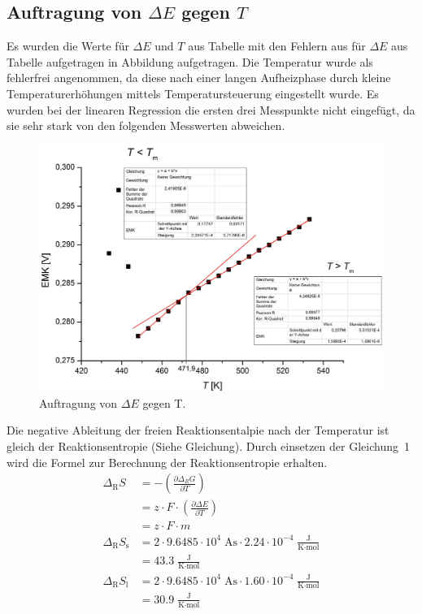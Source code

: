 \documentclass[12pt,a4paper,titlepage,headinclude,bibtotoc]{scrartcl}
\begin{document}
\subsection{Auftragung von $\Delta E$ gegen $T$}
Es wurden die Werte für $\Delta E$ und $T$ aus Tabelle mit den Fehlern aus für $\Delta E$ aus Tabelle aufgetragen in Abbildung aufgetragen. Die Temperatur wurde als fehlerfrei angenommen, da diese nach einer langen Aufheizphase durch kleine Temperaturerhöhungen mittels Temperatursteuerung eingestellt wurde. Es wurden bei der linearen Regression die ersten drei Messpunkte nicht eingefügt, da sie sehr stark von den folgenden Messwerten abweichen. 
\begin{figure}[h]
\includegraphics[width=13.5cm]{EGT.jpeg}
\caption{Auftragung von $\Delta E$ gegen T.}
\end{figure} 
\FloatBarrier
Die negative Ableitung der freien Reaktionsentalpie nach der Temperatur ist gleich der Reaktionsentropie (Siehe Gleichung). Durch einsetzen der Gleichung~1 wird die Formel zur Berechnung der Reaktionsentropie erhalten. 
\begin{align}
\Delta_\text{R} S &= -\left(\frac{\partial \Delta_R G}{\partial T}\right)\\
&= z \cdot F \cdot \left(\frac{\partial \Delta E}{\partial T}\right)\\
&= z \cdot F \cdot m \\
\Delta_\text{R} S_{\text{s}} &= 2 \cdot 9.6485 \cdot 10^4\;\text{As} \cdot 2.24 \cdot 10^{-4}\;\frac{\text{J}}{\text{K}\cdot\text{mol}}\\
&= 43.3\;\frac{\text{J}}{\text{K}\cdot\text{mol}}\\
\Delta_\text{R}  S_{\text{l}} &= 2 \cdot  9.6485 \cdot 10^4\;\text{As} \cdot 1.60 \cdot 10^{-4}\;\frac{\text{J}}{\text{K}\cdot\text{mol}}  \\
&= 30.9\;\frac{\text{J}}{\text{K}\cdot\text{mol}}
\end{align}
\end{document}
